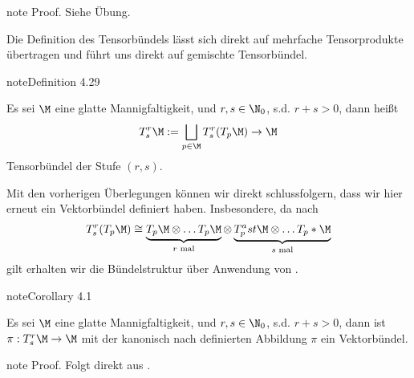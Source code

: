 \documentclass[letterpaper,10pt,english]{jupyterBook}
\begin{document}
\begin{sphinxadmonition}{note}
\sphinxAtStartPar
Proof. Siehe Übung.
\end{sphinxadmonition}

\sphinxAtStartPar
Die Definition des Tensorbündels lässt sich direkt auf mehrfache Tensorprodukte übertragen und führt uns direkt auf gemischte Tensorbündel.
\label{manifolds/tangential:definition-43}
\begin{sphinxadmonition}{note}{Definition 4.29}



\sphinxAtStartPar
Es sei \(\M\) eine glatte Mannigfaltigkeit, und \(r,s\in\N_0\), s.d. \(r+s>0\), dann heißt
\begin{equation*}
\begin{split}T^r_s\M := \bigsqcup_{p\in\M} T^r_s(T_p\M) \to \M\end{split}
\end{equation*}
\sphinxAtStartPar
Tensorbündel der Stufe \((r,s)\).
\end{sphinxadmonition}

\sphinxAtStartPar
Mit den vorherigen Überlegungen können wir direkt schlussfolgern, dass wir hier erneut ein Vektorbündel definiert haben. Insbesondere, da nach {\hyperref[\detokenize{vektoranalysis/tensor:cor:tensorMultilinearform}]{}}
\begin{equation*}
\begin{split}T^r_s(T_p\M) \cong \underbrace{T_p\M\otimes\ldots T_p\M}_{r\text{ mal}}\otimes\underbrace{T_p^ast\M\otimes\ldots T_p\ast\M}_{s\text{ mal}}\end{split}
\end{equation*}
\sphinxAtStartPar
gilt erhalten wir die Bündelstruktur über Anwendung von {\hyperref[\detokenize{manifolds/tangential:lem:tensorbundle}]{}}.
\label{manifolds/tangential:corollary-44}
\begin{sphinxadmonition}{note}{Corollary 4.1}



\sphinxAtStartPar
Es sei \(\M\) eine glatte Mannigfaltigkeit, und \(r,s\in\N_0\), s.d. \(r+s>0\), dann ist \(\pi:T^r_s\M\to\M\) mit der kanonisch nach {\hyperref[\detokenize{manifolds/tangential:lem:tensorbundle}]{}} definierten Abbildung \(\pi\) ein Vektorbündel.
\end{sphinxadmonition}

\begin{sphinxadmonition}{note}
\sphinxAtStartPar
Proof. Folgt direkt aus {\hyperref[\detokenize{manifolds/tangential:lem:tensorbundle}]{}}.
\end{sphinxadmonition}
\end{document}
